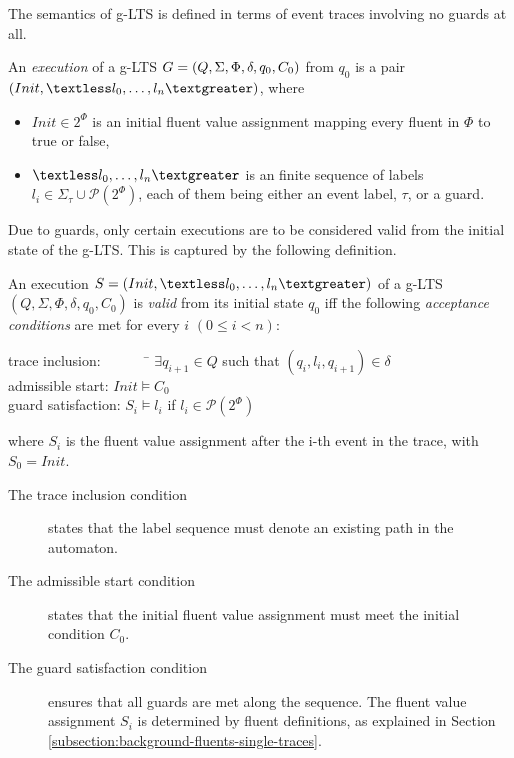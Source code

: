 The semantics of g-LTS is defined in terms of event traces involving no guards at all.

\begin{definition}
An \emph{execution} of a g-LTS $G = (Q,\Sigma,\Phi,\\\delta,q_{0},C_{0})$ from $q_0$ is a pair $(Init, \textless l_0, \ldots,l_n\textgreater)$, where 
\begin{itemize}
\item $Init \in 2^\Phi$ is an initial fluent value assignment mapping every fluent in $\Phi$ to true or false,
\item $\textless l_0,\ldots,l_n \textgreater$ is an finite sequence of labels $l_i \in \Sigma_{\tau}\cup\mathcal{P}(2^\Phi)$, each of them being either an event label, $\tau$, or a guard.
\end{itemize}
\label{definition:glts-execution}
\end{definition}

Due to guards, only certain executions are to be considered valid from the initial state of the g-LTS. This is captured by the following definition.

\begin{definition}
An execution $S = (Init,\textless l_0,\ldots,\\l_n \textgreater)$ of a g-LTS $(Q,\Sigma,\Phi,\delta,q_{0},C_{0})$ is \emph{valid} from its initial state $q_0$ iff the following \emph{acceptance conditions} are met for every $i$ $(0 \leqslant i < n)$:\\
\vspace{-0.8cm}
\begin{tabbing}
\indent trace inclusion:~~~~~~~\= $\exists q_{i+1} \in Q$ such that $(q_i,l_i,q_{i+1}) \in \delta$\\
\indent admissible start:      \> $Init \models C_0$ \\
\indent guard satisfaction:    \> $S_i \models l_i$ if $l_i \in \mathcal{P}(2^\Phi)$\\
\end{tabbing}
\vspace{-0.8cm}
where $S_i$ is the fluent value assignment after the i-th event in the trace, with $S_0 = Init$.
\label{definition:valid-glts-execution}
\end{definition}

\begin{description}
\item[The trace inclusion condition] states that the label sequence must denote an existing path in the automaton.
\item[The admissible start condition] states that the initial fluent value assignment must meet the initial condition $C_0$.
\item[The guard satisfaction condition] ensures that all guards are met along the sequence. The fluent value assignment $S_i$ is determined by fluent definitions, as explained in Section \ref{subsection:background-fluents-single-traces}. 
\end{description}

